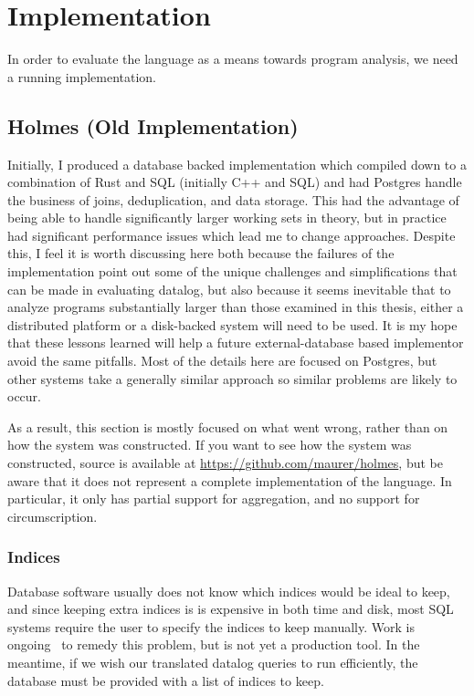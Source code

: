 \section{Implementation}
\label{holmes:sec:impl}
In order to evaluate the language as a means towards program analysis, we need a running implementation.
\subsection{Holmes (Old Implementation)}
Initially, I produced a database backed implementation which compiled down to a combination of Rust and SQL (initially C++ and SQL) and had Postgres handle the business of joins, deduplication, and data storage.
This had the advantage of being able to handle significantly larger working sets in theory, but in practice had significant performance issues which lead me to change approaches.
Despite this, I feel it is worth discussing here both because the failures of the implementation point out some of the unique challenges and simplifications that can be made in evaluating datalog, but also because it seems inevitable that to analyze programs substantially larger than those examined in this thesis, either a distributed platform or a disk-backed system will need to be used.
It is my hope that these lessons learned will help a future external-database based implementor avoid the same pitfalls.
Most of the details here are focused on Postgres, but other systems take a generally similar approach so similar problems are likely to occur.

As a result, this section is mostly focused on what went wrong, rather than on how the system was constructed.
If you want to see how the system was constructed, source is available at \url{https://github.com/maurer/holmes}, but be aware that it does not represent a complete implementation of the language.
In particular, it only has partial support for aggregation, and no support for circumscription.

\subsubsection{Indices}
Database software usually does not know which indices would be ideal to keep, and since keeping extra indices is is expensive in both time and disk, most SQL systems require the user to specify the indices to keep manually.
Work is ongoing~\cite{peloton} to remedy this problem, but is not yet a production tool.
In the meantime, if we wish our translated datalog queries to run efficiently, the database must be provided with a list of indices to keep.

